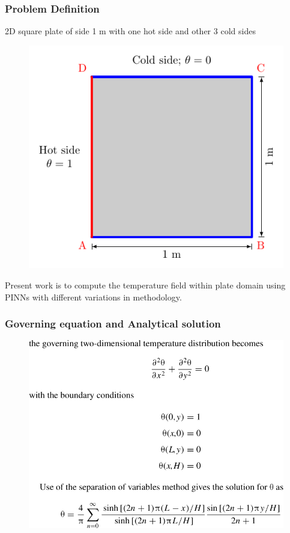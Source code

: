 \begin{frame}
    \frametitle{Problem Definition}
    2D square plate of side 1 m with one hot side and other 3 cold sides
    \begin{figure}
        \includegraphics[scale=0.7]{00_schematic/01_problem_schematic/problemDefinition.pdf}
    \end{figure}

    Present work is to compute the temperature field within plate domain
    using PINNs with different variations in methodology.
\end{frame}

\begin{frame}
    \frametitle{Governing equation and Analytical solution}

    \begin{figure}
        \centering
        \includegraphics[scale=0.4]{supportingFiles/eqn.png}
    \end{figure}
\end{frame}

